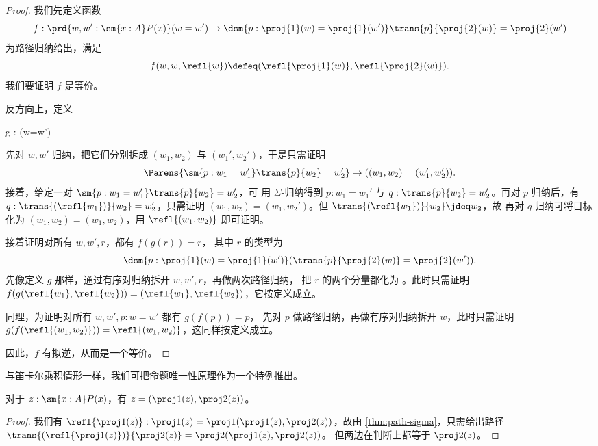 \begin{proof}
我们先定义函数
\begin{equation*}
f : \prd{w,w':\sm{x:A}P(x)} (w=w') \to \dsm{p:\proj{1}(w)=\proj{1}(w')} \trans{p}{\proj{2}(w)}=\proj{2}(w')
\end{equation*}
为路径归纳给出，满足
\begin{equation*}
f(w,w,\refl{w})\defeq(\refl{\proj{1}(w)},\refl{\proj{2}(w)}).
\end{equation*}
我们要证明 $f$ 是等价。

反方向上，定义
\begin{narrowmultline*}
  g : 
      \to
      \narrowbreak
      (w=w')
\end{narrowmultline*}
先对 $w,w'$ 归纳，把它们分别拆成 $(w_1,w_2)$ 与
$(w_1',w_2')$，于是只需证明
\begin{equation*}
\Parens{\sm{p:w_1 = w_1'}\trans{p}{w_2}=w_2'} \to ((w_1,w_2)=(w_1',w_2')).
\end{equation*}
接着，给定一对 $\sm{p:w_1 = w_1'}\trans{p}{w_2}=w_2'$，可
用 $\Sigma$-归纳得到 $p : w_1 = w_1'$ 与 $q :
\trans{p}{w_2}=w_2'$。再对 $p$ 归纳后，有 $q :
\trans{(\refl{w_1})}{w_2}=w_2'$，只需证明
$(w_1,w_2)=(w_1,w_2')$。但 $\trans{(\refl{w_1})}{w_2} \jdeq w_2$，故
再对 $q$ 归纳可将目标化为
$(w_1,w_2)=(w_1,w_2)$，用 $\refl{(w_1,w_2)}$ 即可证明。

接着证明对所有 $w,w',r$，都有 $f(g(r))=r$，
其中 $r$ 的类型为
\[\dsm{p:\proj{1}(w)=\proj{1}(w')} (\trans{p}{\proj{2}(w)}=\proj{2}(w')).\]
先像定义 $g$ 那样，通过有序对归纳拆开 $w,w',r$，再做两次路径归纳，
把 $r$ 的两个分量都化为 。此时只需证明
$f (g(\refl{w_1},\refl{w_2})) = (\refl{w_1},\refl{w_2})$，它按定义成立。

同理，为证明对所有 $w,w',p:w=w'$ 都有 $g(f(p))=p$，
先对 $p$ 做路径归纳，再做有序对归纳拆开 $w$，此时只需证明
$g(f (\refl{(w_1,w_2)})) = \refl{(w_1,w_2)}$，这同样按定义成立。

因此，$f$ 有拟逆，从而是一个等价。
\end{proof}

与笛卡尔乘积情形一样，我们可把命题唯一性原理作为一个特例推出。

\begin{cor}\label{thm:eta-sigma}
  对于 $z:\sm{x:A} P(x)$，有 $z = (\proj1(z),\proj2(z))$。
\end{cor}
\begin{proof}
  我们有 $\refl{\proj1(z)} : \proj1(z) = \proj1(\proj1(z),\proj2(z))$，故由 \cref{thm:path-sigma}，只需给出路径 $\trans{(\refl{\proj1(z)})}{\proj2(z)} = \proj2(\proj1(z),\proj2(z))$。
  但两边在判断上都等于 $\proj2(z)$。
\end{proof}

